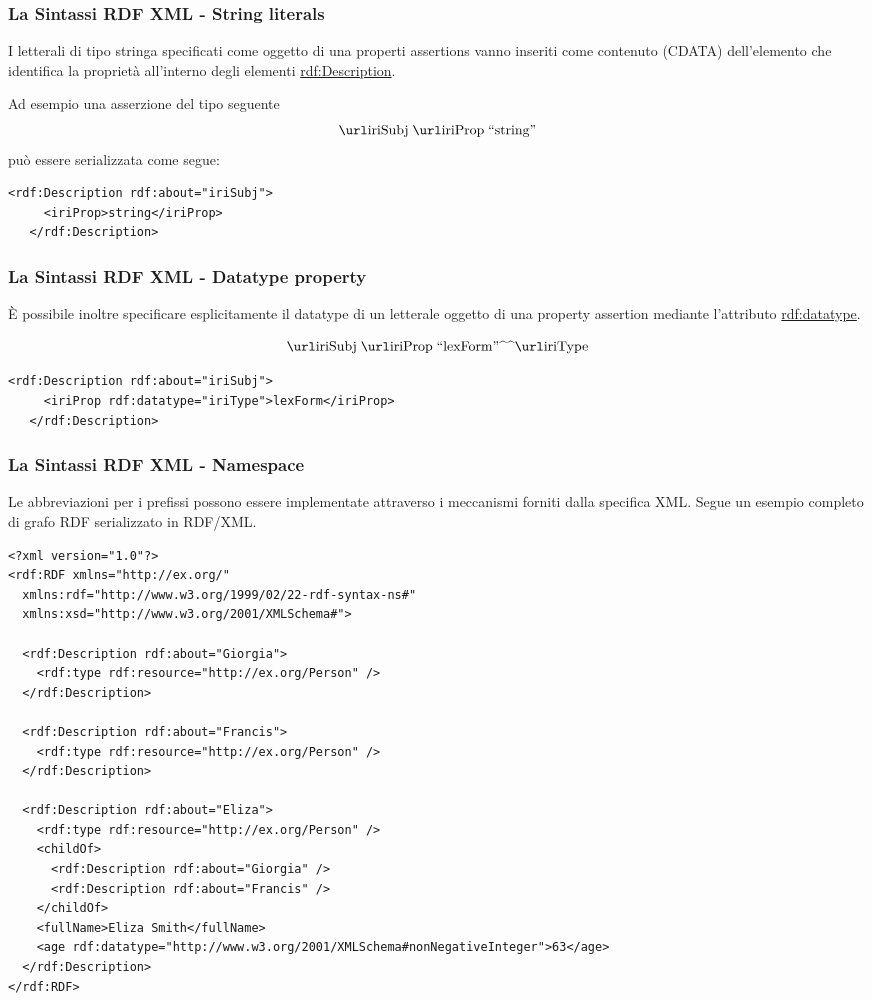 \documentclass[8pt]{beamer}
\begin{document}
\begin{frame}[fragile]
 \frametitle{La Sintassi RDF XML - String literals}
I letterali di tipo stringa specificati come oggetto di una 
properti assertions vanno inseriti come contenuto (CDATA) dell'elemento
che identifica la propriet\`a all'interno degli elementi \url{rdf:Description}.

Ad esempio una asserzione del tipo seguente
\[
 \triple{iriSubj}{iriProp}{\stringLiteral{string}}
\]
pu\`o essere serializzata come segue:
\vspace{\baselineskip}

\begin{Verbatim}[fontsize=\small]
   <rdf:Description rdf:about="iriSubj">
     <iriProp>string</iriProp>
   </rdf:Description>
\end{Verbatim}
\end{frame}

\begin{frame}[fragile]
 \frametitle{La Sintassi RDF XML - Datatype property}
\`E possibile inoltre specificare esplicitamente il datatype di un
letterale oggetto di una property assertion mediante l'attributo \url{rdf:datatype}.

\[
 \triple{iriSubj}{iriProp}{\literal{lexForm}{iriType}}
\]
\vspace{\baselineskip}

\begin{Verbatim}[fontsize=\small]
   <rdf:Description rdf:about="iriSubj">
     <iriProp rdf:datatype="iriType">lexForm</iriProp>
   </rdf:Description>
\end{Verbatim}
\end{frame}

\begin{frame}[fragile]
 \frametitle{La Sintassi RDF XML - Namespace}
Le abbreviazioni per i prefissi possono essere implementate attraverso
i meccanismi forniti dalla specifica XML. Segue un esempio completo
di grafo RDF serializzato in RDF/XML.
\vspace{\baselineskip}

\begin{Verbatim}[fontsize=\small]
<?xml version="1.0"?>
<rdf:RDF xmlns="http://ex.org/"
  xmlns:rdf="http://www.w3.org/1999/02/22-rdf-syntax-ns#"
  xmlns:xsd="http://www.w3.org/2001/XMLSchema#">

  <rdf:Description rdf:about="Giorgia">
    <rdf:type rdf:resource="http://ex.org/Person" />
  </rdf:Description>

  <rdf:Description rdf:about="Francis">
    <rdf:type rdf:resource="http://ex.org/Person" />
  </rdf:Description>
  
  <rdf:Description rdf:about="Eliza">
    <rdf:type rdf:resource="http://ex.org/Person" />
    <childOf>
      <rdf:Description rdf:about="Giorgia" />
      <rdf:Description rdf:about="Francis" />
    </childOf>    
    <fullName>Eliza Smith</fullName>
    <age rdf:datatype="http://www.w3.org/2001/XMLSchema#nonNegativeInteger">63</age>
  </rdf:Description>
</rdf:RDF>
\end{Verbatim}
\end{frame}
\end{document}
